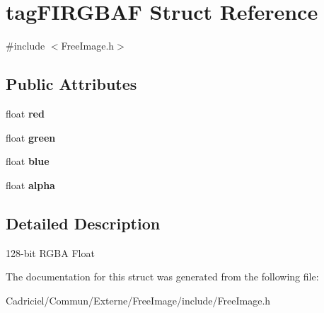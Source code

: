 \hypertarget{structtag_f_i_r_g_b_a_f}{\section{tag\-F\-I\-R\-G\-B\-A\-F Struct Reference}
\label{structtag_f_i_r_g_b_a_f}
}


{\ttfamily \#include $<$Free\-Image.\-h$>$}

\subsection*{Public Attributes}
\begin{DoxyCompactItemize}
\item 
\hypertarget{structtag_f_i_r_g_b_a_f_a59e5260e2f6e013661bc5d4775b18d9e}{float {\bfseries red}}\label{structtag_f_i_r_g_b_a_f_a59e5260e2f6e013661bc5d4775b18d9e}

\item 
\hypertarget{structtag_f_i_r_g_b_a_f_ac4e284e0711fdba31b624cee92d85e2b}{float {\bfseries green}}\label{structtag_f_i_r_g_b_a_f_ac4e284e0711fdba31b624cee92d85e2b}

\item 
\hypertarget{structtag_f_i_r_g_b_a_f_a9c2e5ec45c4c33518fd4765f5fd04b01}{float {\bfseries blue}}\label{structtag_f_i_r_g_b_a_f_a9c2e5ec45c4c33518fd4765f5fd04b01}

\item 
\hypertarget{structtag_f_i_r_g_b_a_f_a59da6fdc089e6ad1f8b2be601815f5cb}{float {\bfseries alpha}}\label{structtag_f_i_r_g_b_a_f_a59da6fdc089e6ad1f8b2be601815f5cb}

\end{DoxyCompactItemize}


\subsection{Detailed Description}
128-\/bit R\-G\-B\-A Float 

The documentation for this struct was generated from the following file\-:\begin{DoxyCompactItemize}
\item 
Cadriciel/\-Commun/\-Externe/\-Free\-Image/include/Free\-Image.\-h\end{DoxyCompactItemize}
